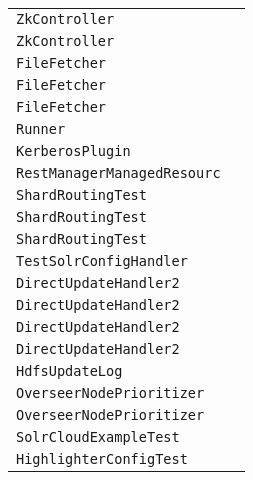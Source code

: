 \begin{center}
\begin{tabular}{ll}
\lstinline/ZkController/&\raisebox{0pt}{\lstinline/publishNodeAsDown(String)/}\\
\lstinline/ZkController/&\raisebox{0pt}{\lstinline/publishNodeAsDown(String)/}\\
\lstinline/FileFetcher/&\raisebox{0pt}{\lstinline/cleanup()/}\\
\lstinline/FileFetcher/&\raisebox{0pt}{\lstinline/cleanup()/}\\
\lstinline/FileFetcher/&\raisebox{0pt}{\lstinline/cleanup()/}\\
\lstinline/Runner/&\raisebox{0pt}{\lstinline/resetTaskWithException(String)/}\\
\lstinline/KerberosPlugin/&\raisebox{0pt}{\lstinline/doAuthenticate(ServletRequest)/}\\
\lstinline/RestManagerManagedResourc/&\raisebox{0pt}{\lstinline/applyUpdatesToManagedData(Object)/}\\
\lstinline/ShardRoutingTest/&\raisebox{0pt}{\lstinline/doAtomicUpdate()/}\\
\lstinline/ShardRoutingTest/&\raisebox{0pt}{\lstinline/doAtomicUpdate()/}\\
\lstinline/ShardRoutingTest/&\raisebox{0pt}{\lstinline/doAtomicUpdate()/}\\
\lstinline/TestSolrConfigHandler/&\raisebox{0pt}{\lstinline/MapgetRespMap(String)/}\\
\lstinline/DirectUpdateHandler2/&\raisebox{0pt}{\lstinline/rollback(RollbackUpdateCommand)/}\\
\lstinline/DirectUpdateHandler2/&\raisebox{0pt}{\lstinline/rollback(RollbackUpdateCommand)/}\\
\lstinline/DirectUpdateHandler2/&\raisebox{0pt}{\lstinline/rollback(RollbackUpdateCommand)/}\\
\lstinline/DirectUpdateHandler2/&\raisebox{0pt}{\lstinline/rollback(RollbackUpdateCommand)/}\\
\lstinline/HdfsUpdateLog/&\raisebox{0pt}{\lstinline/clearLog(SolrCore,Plugino)/}\\
\lstinline/OverseerNodePrioritizer/&\raisebox{0pt}{\lstinline/prioritizeOverseerNodes(Stringoverse)/}\\
\lstinline/OverseerNodePrioritizer/&\raisebox{0pt}{\lstinline/prioritizeOverseerNodes(Stringoverse)/}\\
\lstinline/SolrCloudExampleTest/&\raisebox{0pt}{\lstinline/doTestConfigUpdate(Stringt))/}\\
\lstinline/HighlighterConfigTest/&\raisebox{0pt}{\lstinline/testConfig()/}\\

\end{tabular}
\end{center}
